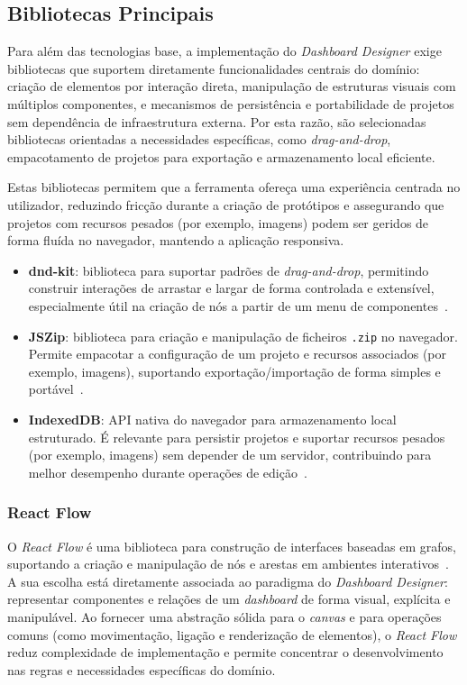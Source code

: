 \subsection{Bibliotecas Principais}
\label{subsec:cap3_bibliotecas_principais}

Para além das tecnologias base, a implementação do \textit{Dashboard Designer} exige bibliotecas que suportem diretamente funcionalidades centrais do domínio: criação de elementos por interação direta, manipulação de estruturas visuais com múltiplos componentes, e mecanismos de persistência e portabilidade de projetos sem dependência de infraestrutura externa. Por esta razão, são selecionadas bibliotecas orientadas a necessidades específicas, como \textit{drag-and-drop}, empacotamento de projetos para exportação e armazenamento local eficiente.

Estas bibliotecas permitem que a ferramenta ofereça uma experiência centrada no utilizador, reduzindo fricção durante a criação de protótipos e assegurando que projetos com recursos pesados (por exemplo, imagens) podem ser geridos de forma fluída no navegador, mantendo a aplicação responsiva.

\begin{itemize}
  \item \textbf{dnd-kit}: biblioteca para suportar padrões de \textit{drag-and-drop}, permitindo construir interações de arrastar e largar de forma controlada e extensível, especialmente útil na criação de nós a partir de um menu de componentes~\cite{dndkit}.
  \item \textbf{JSZip}: biblioteca para criação e manipulação de ficheiros \texttt{.zip} no navegador. Permite empacotar a configuração de um projeto e recursos associados (por exemplo, imagens), suportando exportação/importação de forma simples e portável~\cite{jszip}.
  \item \textbf{IndexedDB}: API nativa do navegador para armazenamento local estruturado. É relevante para persistir projetos e suportar recursos pesados (por exemplo, imagens) sem depender de um servidor, contribuindo para melhor desempenho durante operações de edição~\cite{IndexedDB}.
\end{itemize}

\subsubsection{React Flow}
\label{subsubsec:cap3_reactflow}

O \textit{React Flow} é uma biblioteca para construção de interfaces baseadas em grafos, suportando a criação e manipulação de nós e arestas em ambientes interativos~\cite{reactflow}. A sua escolha está diretamente associada ao paradigma do \textit{Dashboard Designer}: representar componentes e relações de um \textit{dashboard} de forma visual, explícita e manipulável. Ao fornecer uma abstração sólida para o \textit{canvas} e para operações comuns (como movimentação, ligação e renderização de elementos), o \textit{React Flow} reduz complexidade de implementação e permite concentrar o desenvolvimento nas regras e necessidades específicas do domínio.

